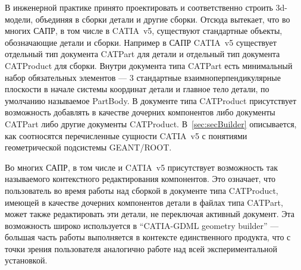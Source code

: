 В инженерной практике принято проектировать и соответственно строить 3d-модели, объединяя в сборки детали и другие сборки. Отсюда вытекает, что во многих САПР, в том числе в CATIA~v5, существуют стандартные объекты, обозначающие детали и сборки. Например в САПР CATIA~v5 существует отдельный тип документа CATPart для детали и отдельный тип документа CATProduct для сборки. Внутри документа типа CATPart есть минимальный набор обязательных элементов --- 3 стандартные взаимноперпендикулярные плоскости в начале системы координат детали и главное тело детали, по умолчанию называемое PartBody. В документе типа CATProduct присутствует возможность добавлять в качестве дочерних компонентов либо документы CATPart либо другие документы CATProduct. В~\ref{sec:secBuilder} описывается, как соотносятся перечисленные сущности CATIA~v5 с понятиями геометрической подсистемы GEANT/ROOT.

Во многих САПР, в том числе и CATIA~v5 присутствует возможность так называемого контекстного редактирования компонентов. Это означает, что пользователь во время работы над сборкой в документе типа CATProduct, имеющей в качестве дочерних компонентов детали в файлах типа CATPart, может также редактировать эти детали, не переключая активный документ. Эта возможность широко используется в ``CATIA-GDML geometry builder'' --- большая часть работы выполняется в контексте единственного продукта, что с точки зрения пользователя аналогично работе над всей экспериментальной установкой.



